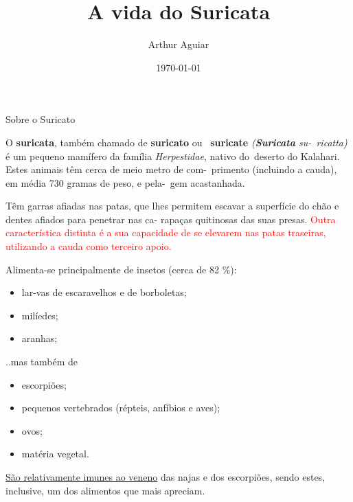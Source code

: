\documentclass[11pt]{beamer}
\title{A vida do Suricata}
\author{Arthur Aguiar}
\date{\today}
\begin{document}
	\maketitle

	\begin{frame}[ allowframebreaks ]{Sobre o Suricato}
	
		O \textbf{suricata}, também chamado de \textbf{suricato} ou \
		\textbf{suricate} \textit{(\textbf{Suricata} su-\
		ricatta)} é um pequeno mamífero da família \textit{Herpestidae}, nativo do\
		deserto do Kalahari. Estes animais têm cerca de meio metro de com-\
		primento (incluindo a cauda), em média 730 gramas de peso, e pela-\
		gem acastanhada.

		Têm garras afiadas nas patas, que lhes permitem
		escavar a superfície do chão e dentes afiados para penetrar nas ca-
		rapaças quitinosas das suas presas. \textcolor{red}{Outra característica 
		distinta é a sua capacidade de se elevarem nas patas traseiras, utilizando
		 a cauda como terceiro apoio.}
		
		\vskip 2.5cm

		Alimenta-se principalmente de insetos (cerca de 82 \%):

		\begin{itemize}
			\item lar-vas de escaravelhos e de borboletas;
			\item milíedes;
			\item aranhas;
		\end{itemize}

	..mas também de

		\begin{itemize}
			\item escorpiões;
			\item pequenos vertebrados (répteis, anfíbios e aves);
			\item ovos;
			\item matéria vegetal.
		\end{itemize}

		\uline{São relativamente imunes ao veneno} das najas
		e dos escorpiões, sendo estes, inclusive, um dos alimentos que mais
		apreciam.

	\end{frame}
\end{document}
